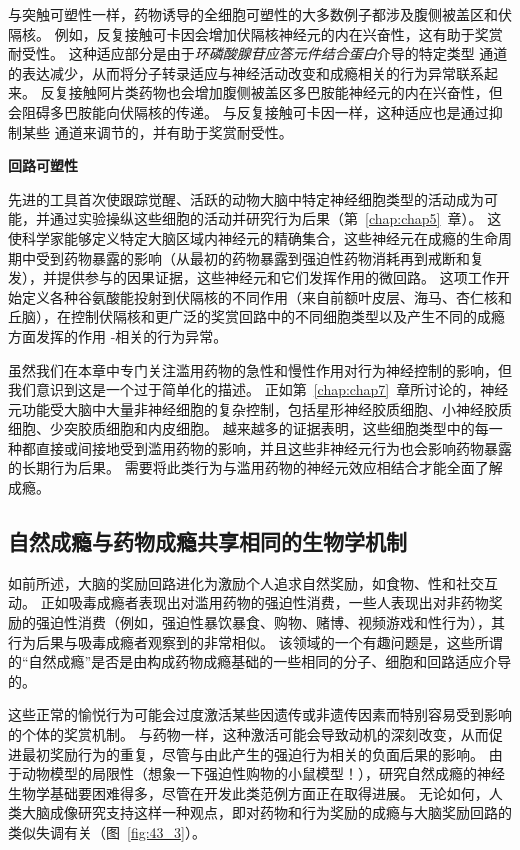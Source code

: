 与突触可塑性一样，药物诱导的全细胞可塑性的大多数例子都涉及腹侧被盖区和伏隔核。
例如，反复接触可卡因会增加伏隔核神经元的内在兴奋性，这有助于奖赏耐受性。
这种适应部分是由于\textit{环磷酸腺苷应答元件结合蛋白}介导的特定类型  通道的表达减少，从而将分子转录适应与神经活动改变和成瘾相关的行为异常联系起来。
反复接触阿片类药物也会增加腹侧被盖区多巴胺能神经元的内在兴奋性，但会阻碍多巴胺能向伏隔核的传递。
与反复接触可卡因一样，这种适应也是通过抑制某些  通道来调节的，并有助于奖赏耐受性。


\textbf{回路可塑性}

先进的工具首次使跟踪觉醒、活跃的动物大脑中特定神经细胞类型的活动成为可能，并通过实验操纵这些细胞的活动并研究行为后果（第~\ref{chap:chap5}~章）。
这使科学家能够定义特定大脑区域内神经元的精确集合，这些神经元在成瘾的生命周期中受到药物暴露的影响（从最初的药物暴露到强迫性药物消耗再到戒断和复发），并提供参与的因果证据，这些神经元和它们发挥作用的微回路。
这项工作开始定义各种谷氨酸能投射到伏隔核的不同作用（来自前额叶皮层、海马、杏仁核和丘脑），在控制伏隔核和更广泛的奖赏回路中的不同细胞类型以及产生不同的成瘾方面发挥的作用 -相关的行为异常。


虽然我们在本章中专门关注滥用药物的急性和慢性作用对行为神经控制的影响，但我们意识到这是一个过于简单化的描述。
正如第~\ref{chap:chap7}~章所讨论的，神经元功能受大脑中大量非神经细胞的复杂控制，包括星形神经胶质细胞、小神经胶质细胞、少突胶质细胞和内皮细胞。
越来越多的证据表明，这些细胞类型中的每一种都直接或间接地受到滥用药物的影响，并且这些非神经元行为也会影响药物暴露的长期行为后果。
需要将此类行为与滥用药物的神经元效应相结合才能全面了解成瘾。



\subsection{自然成瘾与药物成瘾共享相同的生物学机制}

如前所述，大脑的奖励回路进化为激励个人追求自然奖励，如食物、性和社交互动。
正如吸毒成瘾者表现出对滥用药物的强迫性消费，一些人表现出对非药物奖励的强迫性消费（例如，强迫性暴饮暴食、购物、赌博、视频游戏和性行为），其行为后果与吸毒成瘾者观察到的非常相似。
该领域的一个有趣问题是，这些所谓的“自然成瘾”是否是由构成药物成瘾基础的一些相同的分子、细胞和回路适应介导的。


这些正常的愉悦行为可能会过度激活某些因遗传或非遗传因素而特别容易受到影响的个体的奖赏机制。
与药物一样，这种激活可能会导致动机的深刻改变，从而促进最初奖励行为的重复，尽管与由此产生的强迫行为相关的负面后果的影响。
由于动物模型的局限性（想象一下强迫性购物的小鼠模型！），研究自然成瘾的神经生物学基础要困难得多，尽管在开发此类范例方面正在取得进展。
无论如何，人类大脑成像研究支持这样一种观点，即对药物和行为奖励的成瘾与大脑奖励回路的类似失调有关（图~\ref{fig:43_3}）。



